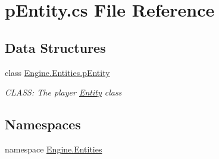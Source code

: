 \hypertarget{a00023}{}\section{p\+Entity.\+cs File Reference}
\label{a00023}
\subsection*{Data Structures}
\begin{DoxyCompactItemize}
\item 
class \hyperlink{a00322}{Engine.\+Entities.\+p\+Entity}
\begin{DoxyCompactList}\small\item\em C\+L\+A\+SS\+: The player \hyperlink{a00314}{Entity} class \end{DoxyCompactList}\end{DoxyCompactItemize}
\subsection*{Namespaces}
\begin{DoxyCompactItemize}
\item 
namespace \hyperlink{a00242}{Engine.\+Entities}
\end{DoxyCompactItemize}
